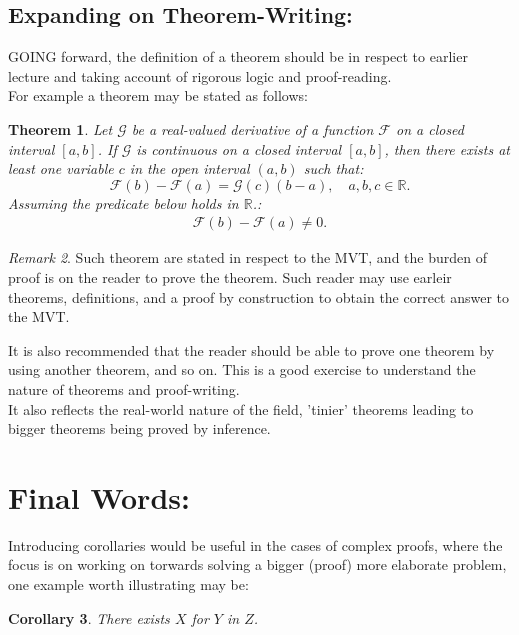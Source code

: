 \documentclass[10pt]{article}
\theoremstyle{plain}
\newtheorem{theorem}{Theorem}[section]
\newtheorem{corollary}[theorem]{Corollary}
\theoremstyle{definition}
\theoremstyle{remark}
\newtheorem{remark}[theorem]{Remark}
\begin{document}
\subsection{Expanding on Theorem-Writing:}

\lettrine[lines=2, lhang=0.1, loversize=0.2]{G}OING forward, the definition of a theorem should be in respect to earlier lecture and taking account of rigorous logic and proof-reading.\\
For example a theorem may be stated as follows:

\begin{theorem}
	Let $\mathcal{G}$ be a real-valued derivative of a function $\mathcal{F}$ on a closed interval $[a, b]$. If $\mathcal{G}$ is continuous on a closed interval $[a, b]$, then there exists at least one variable $c$ in the open interval $(a, b)$ such that:
	\begin{equation}
		\mathcal{F}(b) - \mathcal{F}(a) = \mathcal{G}(c)(b - a), \quad a, b, c \in \mathbb{R}.
	\end{equation}
	Assuming the predicate below holds in $\mathbb{R}$.:
	\begin{align*}
	\mathcal{F}(b) - \mathcal{F}(a) \neq 0.
	\end{align*}
\end{theorem}
\begin{remark}
	Such theorem are stated in respect to the MVT, and the burden of proof is on the reader to prove the theorem. Such reader may use earleir theorems, definitions, and a proof by construction to obtain the correct answer to the MVT.
\end{remark}
It is also recommended that the reader should be able to prove one theorem by using another theorem, and so on. This is a good exercise to understand the nature of theorems and proof-writing.\\
It also reflects the real-world nature of the field, 'tinier' theorems leading to bigger theorems being proved by inference. 

\section{Final Words:}

Introducing corollaries would be useful in the cases of complex proofs, where the focus is on working on torwards solving a bigger (proof) more elaborate problem, one example worth illustrating may be:

\begin{corollary}
	There exists $X$ for $Y$ in $Z$.
\end{corollary}
\end{document}
